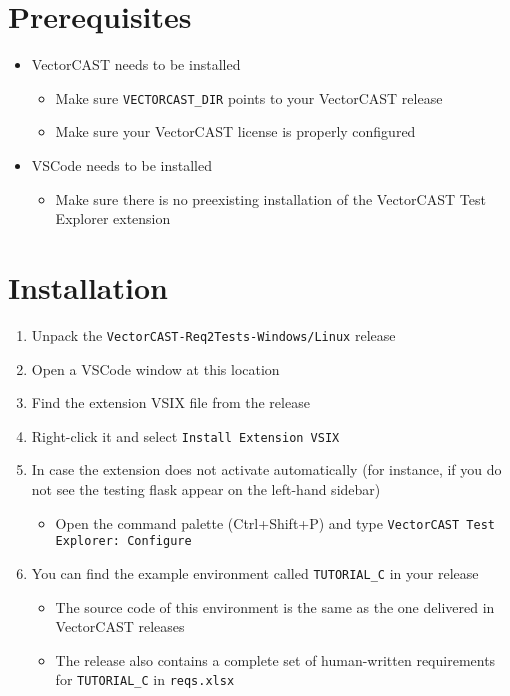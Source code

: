 

\section*{Prerequisites}
\begin{itemize}
  \item VectorCAST needs to be installed
  \begin{itemize}
    \item Make sure \texttt{VECTORCAST\_DIR} points to your VectorCAST release
    \item Make sure your VectorCAST license is properly configured
  \end{itemize}
  \item VSCode needs to be installed
  \begin{itemize}
    \item Make sure there is no preexisting installation of the VectorCAST Test Explorer extension
  \end{itemize}
\end{itemize}

\section*{Installation}
\begin{enumerate}
    \item Unpack the \texttt{VectorCAST-Req2Tests-Windows/Linux} release
    \item Open a VSCode window at this location
    \item Find the extension VSIX file from the release
    \item Right-click it and select \texttt{Install Extension VSIX}
    \item In case the extension does not activate automatically (for instance, if you do not see the testing
    flask appear on the left-hand sidebar)
    \begin{itemize}
      \item Open the command palette (Ctrl+Shift+P) and type \texttt{VectorCAST Test Explorer: Configure}
    \end{itemize}
    \item You can find the example environment called \texttt{TUTORIAL\_C} in your release
    \begin{itemize}
      \item The source code of this environment is the same as the one delivered in VectorCAST releases
      \item The release also contains a complete set of human-written requirements for \texttt{TUTORIAL\_C} in
      \texttt{reqs.xlsx}
    \end{itemize}
\end{enumerate}

